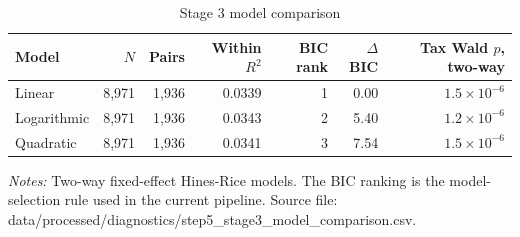 \begin{table}[H]
\centering
\small
\caption[Stage 3 model comparison]{Stage 3 model comparison}
\label{tab:stage3_model_comparison}
\begin{tabular}{@{}lrrrrrr@{}}
\toprule
Model & $N$ & Pairs & Within $R^2$ & BIC rank & $\Delta$BIC & Tax Wald $p$, two-way \\
\midrule
Linear & 8,971 & 1,936 & 0.0339 & 1 & 0.00 & $1.5 \times 10^{-6}$ \\
Logarithmic & 8,971 & 1,936 & 0.0343 & 2 & 5.40 & $1.2 \times 10^{-6}$ \\
Quadratic & 8,971 & 1,936 & 0.0341 & 3 & 7.54 & $1.5 \times 10^{-6}$ \\
\bottomrule
\end{tabular}

\vspace{0.5em}
\begin{minipage}{0.96\textwidth}
\footnotesize\raggedright \textit{Notes:} Two-way fixed-effect Hines-Rice models. The BIC ranking is the model-selection rule used in the current pipeline. Source file: data/processed/diagnostics/step5\_stage3\_model\_comparison.csv.
\end{minipage}
\end{table}
